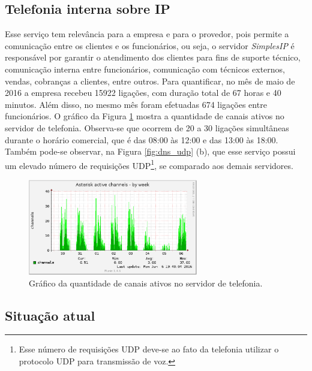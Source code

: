 \subsection{Telefonia interna sobre IP}
\label{section:telefonia}

Esse serviço tem relevância para a empresa e para o provedor, pois permite a comunicação entre os clientes e os funcionários, ou seja, o 
servidor \textit{SimplesIP} é responsável por garantir o atendimento dos clientes para fins de suporte técnico, comunicação interna entre 
funcionários, comunicação com técnicos externos, vendas, cobranças a clientes, entre outros. Para quantificar, no mês de maio de 2016 a empresa 
recebeu 15922 ligações, com duração total de 67 horas e 40 minutos. Além disso, no mesmo mês foram efetuadas 674 ligações entre funcionários. 
O gráfico da Figura \ref{fig:simplesip_week} mostra a quantidade de canais ativos no servidor de telefonia. Observa-se que ocorrem 
de 20 a 30 ligações simultâneas durante o horário comercial, que é das 08:00 às 12:00 e das 13:00 às 18:00. Também pode-se observar, na Figura 
\ref{fig:dns_udp} (b), que esse serviço possui um elevado número de requisições \ac{UDP}\footnote[2]{Esse número de requisições \ac{UDP} 
deve-se ao fato da telefonia utilizar o protocolo \ac{UDP} para transmissão de voz.}, se comparado aos demais servidores.

\begin{figure}[h!]
 \centering
 \includegraphics[width=280px]{img/simplesip_week.eps}
 \caption{Gráfico da quantidade de canais ativos no servidor de telefonia.}
 \label{fig:simplesip_week}
\end{figure}

\subsection{Situação atual}
\label{section:maqservcrit}


